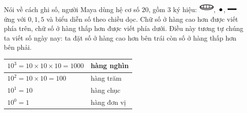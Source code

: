 \begin{multicols}{2}
	\vskip 0.1cm
	Nói về cách ghi số,  người Maya dùng hệ cơ số $20$, gồm $3$ ký hiệu:  \includegraphics[scale=0.7]{29},  \includegraphics[scale=0.7]{30}, \includegraphics[scale=0.7]{31}  ứng với $0,1, 5$ và biểu diễn số theo chiều dọc. Chữ số ở hàng cao hơn được viết phía trên, chữ số ở hàng thấp hơn được viết phía dưới. Điều này tương tự chúng ta viết số ngày nay: ta đặt số ở hàng cao hơn bên trái còn số ở hàng thấp hơn bên phải. 
	\begin{table}[H]
		\vspace*{-5pt}
		\centering
		\setlength{\tabcolsep}{4.5pt}
		\renewcommand{\arraystretch}{1.3}
		\begin{tabular}{|l|l|}
			\hline
			$10^3 = 10\!\times\! 10 \!\times\! 10 =1000$& hàng nghìn\\
			\hline
			$10^2 = 10\!\times\! 10 =100$& hàng trăm\\
			\hline
			$10^1 = 10$& hàng chục\\
			\hline
			$10^0 = 1$& hàng đơn vị\\
			\hline
		\end{tabular}
	\end{table}

\end{multicols}
